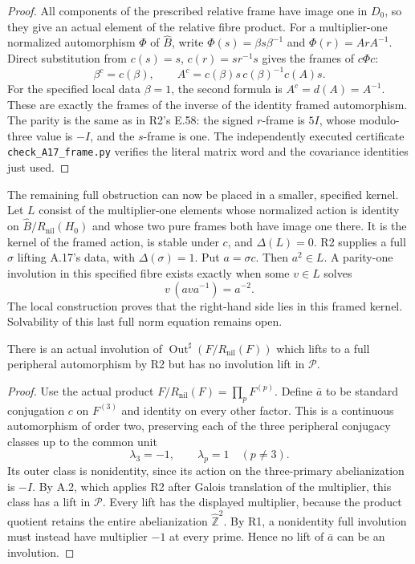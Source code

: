 \begin{proof}
All components of the prescribed relative frame have
image one in \(D_0\), so they give an actual element
of the relative fibre product. For a multiplier-one
normalized automorphism \(\Phi\) of \(\widehat B\),
write \(\Phi(s)=\beta s\beta^{-1}\) and
\(\Phi(r)=A rA^{-1}\). Direct substitution from
\(c(s)=s\), \(c(r)=sr^{-1}s\) gives the frames of
\(c\Phi c\):
\[
 \beta^c=c(\beta),\qquad
 A^c=c(\beta)s\,c(\beta)^{-1}c(A)s.
\]
For the specified local data \(\beta=1\), the second
formula is \(A^c=d(A)=A^{-1}\). These are exactly
the frames of the inverse of the identity framed
automorphism. The parity is the same as in R2's E.58:
the signed \(r\)-frame is \(5I\), whose modulo-three
value is \(-I\), and the \(s\)-frame is one.
The independently executed certificate
\texttt{check\_A17\_frame.py} verifies the literal
matrix word and the covariance identities just used.
\end{proof}

The remaining full obstruction can now be placed in a
smaller, specified kernel. Let \(L\) consist of the
multiplier-one elements whose normalized action is
identity on \(\widehat B/R_{\mathrm{nil}}(H_0)\) and whose
two pure frames both have image one there. It is the
kernel of the framed action, is stable under \(c\), and
\(\Delta(L)=0\). R2 supplies a full \(\sigma\) lifting
A.17's data, with \(\Delta(\sigma)=1\). Put \(a=\sigma c\).
Then \(a^2\in L\). A parity-one involution in this
specified fibre exists exactly when some \(v\in L\)
solves
\[
                   v\,(ava^{-1})=a^{-2}.
\]
The local construction proves that the right-hand side
lies in this framed kernel. Solvability of this last full
norm equation remains open.

There is an actual involution of
\(\operatorname{Out}^{\sharp}(F/R_{\mathrm{nil}}(F))\)
which lifts to a full peripheral automorphism by R2 but
has no involution lift in \(\mathcal P\).

\begin{proof}
Use the actual product
\(F/R_{\mathrm{nil}}(F)=\prod_pF^{(p)}\).
Define \(\bar a\) to be standard conjugation \(c\)
on \(F^{(3)}\) and identity on every other factor.
This is a continuous automorphism of order two,
preserving each of the three peripheral conjugacy
classes up to the common unit
\[
 \lambda_3=-1,\qquad \lambda_p=1\quad(p\ne3).
\]
Its outer class is nonidentity, since its action on
the three-primary abelianization is \(-I\).
By A.2, which applies R2 after Galois translation
of the multiplier, this class has a lift in
\(\mathcal P\). Every lift has the displayed
multiplier, because the product quotient retains
the entire abelianization \(\widehat{\mathbb Z}^2\).
By R1, a nonidentity full involution must instead
have multiplier \(-1\) at every prime. Hence no
lift of \(\bar a\) can be an involution.
\end{proof}

